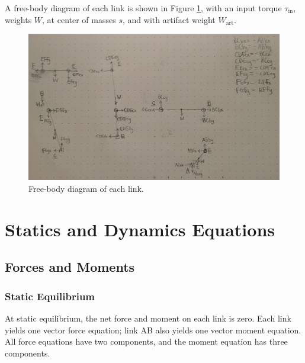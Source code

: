 \documentclass[12pt]{article}
\begin{document}
A free-body diagram of each link is shown in Figure \ref{fig:fbds}, with an input torque $\tau_{\text{in}}$, weights $W$, at center of masses $s$, and with artifact weight $W_{\text{art}}$.

\begin{figure}[H]
  \centering
  \includegraphics[scale=0.3]{../fbds.jpeg}
  \caption{\label{fig:fbds}Free-body diagram of each link.}
\end{figure}

\section{Statics and Dynamics Equations}%
\label{eqns}

\subsection{Forces and Moments}%
\label{eqns.forces-moments}

\subsubsection{Static Equilibrium}%
\label{eqns.forces-moments.static}

At static equilibrium, the net force and moment on each link is zero. Each link yields one vector force equation; link AB also yields one vector moment equation. All force equations have two components, and the moment equation has three components.
\end{document}
